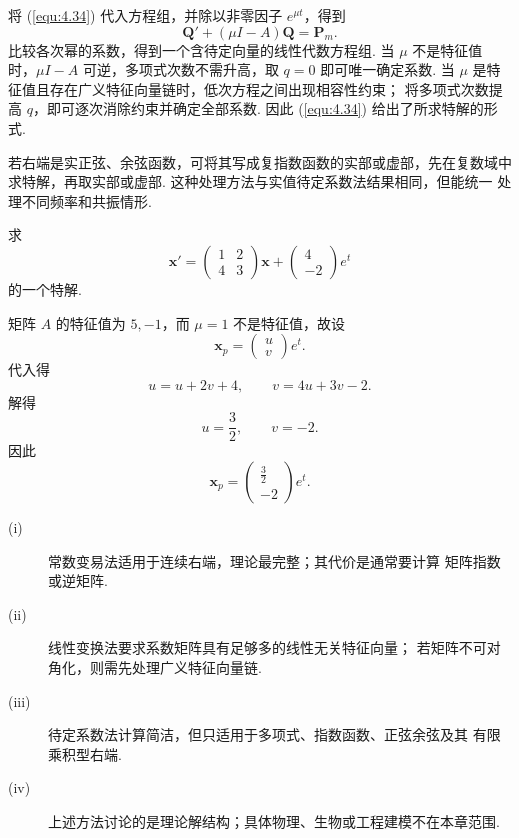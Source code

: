 \begin{pf1}
将 (\ref{equ:4.34}) 代入方程组，并除以非零因子 $e^{\mu t}$，得到
\[
\bm{Q}'+(\mu I-A)\bm{Q}=\bm{P}_m.
\]
比较各次幂的系数，得到一个含待定向量的线性代数方程组. 当 $\mu$ 不是特征值
时，$\mu I-A$ 可逆，多项式次数不需升高，取 $q=0$ 即可唯一确定系数.
当 $\mu$ 是特征值且存在广义特征向量链时，低次方程之间出现相容性约束；
将多项式次数提高 $q$，即可逐次消除约束并确定全部系数. 因此
(\ref{equ:4.34}) 给出了所求特解的形式.
\end{pf1}

\begin{rmk}
若右端是实正弦、余弦函数，可将其写成复指数函数的实部或虚部，先在复数域中
求特解，再取实部或虚部. 这种处理方法与实值待定系数法结果相同，但能统一
处理不同频率和共振情形.
\end{rmk}

\begin{eg}
求
\[
\bm{x}'=
\begin{pmatrix}
1&2\\
4&3
\end{pmatrix}\bm{x}
+\begin{pmatrix}4\\-2\end{pmatrix}e^t
\]
的一个特解.
\begin{pf2}
矩阵 $A$ 的特征值为 $5,-1$，而 $\mu=1$ 不是特征值，故设
\[
\bm{x}_p=\begin{pmatrix}u\\v\end{pmatrix}e^t.
\]
代入得
\[
u=u+2v+4,\qquad v=4u+3v-2.
\]
解得
\[
u=\frac32,\qquad v=-2.
\]
因此
\[
\bm{x}_p=
\begin{pmatrix}
\frac32\\-2
\end{pmatrix}e^t.
\]
\end{pf2}
\end{eg}

\begin{rmk}
\begin{description}
\item[(i)] 常数变易法适用于连续右端，理论最完整；其代价是通常要计算
矩阵指数或逆矩阵.
\item[(ii)] 线性变换法要求系数矩阵具有足够多的线性无关特征向量；
若矩阵不可对角化，则需先处理广义特征向量链.
\item[(iii)] 待定系数法计算简洁，但只适用于多项式、指数函数、正弦余弦及其
有限乘积型右端.
\item[(iv)] 上述方法讨论的是理论解结构；具体物理、生物或工程建模不在本章范围.
\end{description}
\end{rmk}

